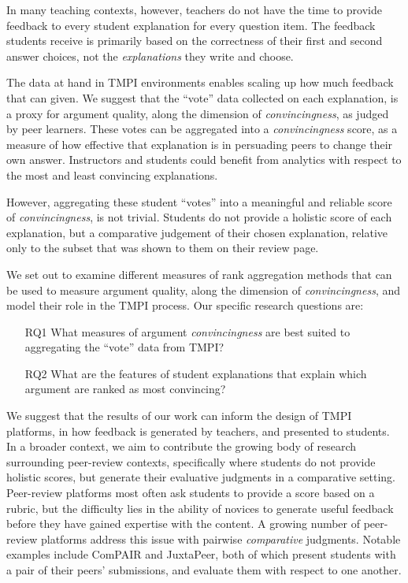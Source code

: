 \documentclass[sigconf]{acmart}
\begin{document}
In many teaching contexts, however, teachers do not have the time to provide 
feedback to every student explanation for every question item. 
The feedback students receive is primarily based on the correctness of their 
first and second answer choices, not the \textit{explanations} they write and 
choose.

The data at hand in TMPI environments enables scaling up how much feedback that 
can given.
We suggest that the ``vote'' data collected on each explanation, is a proxy for 
argument quality, along the dimension of \textit{convincingness}, as judged by 
peer learners. 
These votes can be aggregated into a \textit{convincingness} score, as a 
measure of how effective that explanation is in persuading peers to change 
their own answer.
Instructors and students could benefit from analytics with respect to the most 
and least convincing explanations.

However, aggregating these student ``votes'' into a meaningful and reliable 
score of \textit{convincingness}, is not trivial. 
Students do not provide a holistic score of each explanation, but a comparative 
judgement of their chosen explanation, relative only to the subset that was 
shown to them on their review page.

We set out to examine different measures of rank aggregation methods that can 
be used to measure argument quality, along the dimension of 
\textit{convincingness}, and model their role in the TMPI process. 
Our specific research questions are:
\begin{itemize}
	\item[RQ1] What measures of argument \textit{convincingness} are best 
	suited to aggregating the ``vote'' data from TMPI?
	\item[RQ2] What are the features of student explanations that explain which 
	argument are ranked as most convincing?
\end{itemize}

We suggest that the results of our work can inform the design of TMPI 
platforms, in how feedback is generated by teachers, and presented to students. 
In a broader context, we aim to contribute the growing body of research 
surrounding peer-review contexts, specifically where students do not provide 
holistic scores, but generate their evaluative judgments in a comparative 
setting.
Peer-review platforms most often ask students to provide a score based on a 
rubric, but the difficulty lies in the ability of novices to generate useful 
feedback before they have gained expertise with the content. 
A growing number of peer-review platforms address this issue with pairwise
\textit{comparative} judgments.
Notable examples include ComPAIR\cite{potter_compair:_2017} and 
JuxtaPeer\cite{cambre_juxtapeer:_2018}, both of which present students with a 
pair of their peers' submissions, and evaluate them with respect to one another.
\end{document}
